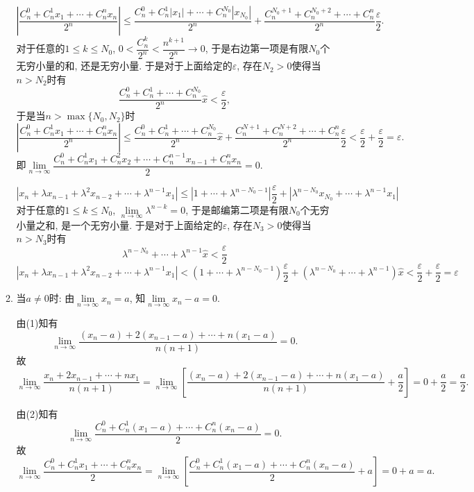\documentclass[UTF8,a4paper,20pt]{article}
\begin{document}
\begin{enumerate}
\begin{enumerate}[1$^{\circ}$]
	\begin{equation*}
	\left|\dfrac{C_n^0+C_n^1x_1+\cdots+C_n^n x_n}{2^n}\right|\leqslant\dfrac{C_n^0+C_n^1|x_1|+\cdots+C_n^{N_0}|x_{N_0}|}{2^n}+\dfrac{C_n^{N_0+1}+C_n^{N_0+2}+\cdots+C_n^n}{2^n}\dfrac{\varepsilon}{2}.
	\end{equation*}
对于任意的$1\leqslant k\leqslant N_0$, $0<\dfrac{C_n^k}{2^n}<\dfrac{n^{k+1}}{2^n}\to 0$, 于是右边第一项是有限$N_0$个无穷小量的和, 还是无穷小量. 于是对于上面给定的$\varepsilon$, 存在$N_2>0$使得当$n>N_2$时有
\[\dfrac{C_n^0+C_n^1+\cdots+C_n^{N_0}}{2^n}\hat{x}<\dfrac{\varepsilon}{2},\]
于是当$n>\max\{N_0,N_2\}$时
	\[\left|\dfrac{C_n^0+C_n^1x_1+\cdots+C_n^n x_n}{2^n}\right|\leqslant\dfrac{C_n^0+C_n^1+\cdots+C_n^{N_0}}{2^n}\hat{x}+\dfrac{C_n^{N+1}+C_n^{N+2}+\cdots+C_n^n}{2^n}\dfrac{\varepsilon}{2}<\dfrac{\varepsilon}{2}+\dfrac{\varepsilon}{2}=\varepsilon.\]
即$\lim\limits_{n\to\infty}\dfrac{C_n^0+C_n^1x_1+C_n^2x_2+\cdots+C_n^{n-1}x_{n-1}+C_n^n x_n}{2}=0$.

	\begin{equation*}
	\left|x_n+\lambda x_{n-1}+ \lambda^2 x_{n-2}+\cdots+\lambda^{n-1}x_1\right|\leqslant\left|1+\cdots+\lambda^{n-N_0-1}\right|\dfrac{\varepsilon}{2}+|\lambda^{n-N_0}x_{N_0}+\cdots+\lambda^{n-1}x_1|
	\end{equation*}
对于任意的$1\leqslant k\leqslant N_0$, $\lim\limits_{n\to\infty}\lambda^{n-k}=0$, 于是邮编第二项是有限$N_0$个无穷小量之和, 是一个无穷小量. 于是对于上面给定的$\varepsilon$, 存在$N_3>0$使得当$n>N_3$时有
\[\lambda^{n-N_0}+\cdots+\lambda^{n-1}\hat{x}<\dfrac{\varepsilon}{2}\]
\[\left|x_n+\lambda x_{n-1}+ \lambda^2 x_{n-2}+\cdots+\lambda^{n-1}x_1\right|<(1+\cdots+\lambda^{n-N_0-1})\dfrac{\varepsilon}{2}+(\lambda^{n-N_0}+\cdots+\lambda^{n-1})\hat{x}<\dfrac{\varepsilon}{2}+\dfrac{\varepsilon}{2}=\varepsilon\]
	\item {\heiti 当$a\neq 0$时:} 由$\lim\limits_{n\to\infty}x_n=a$, 知$\lim\limits_{n\to\infty}x_n-a=0$.

 由(1)知有
\[\lim\limits_{n\to\infty}\dfrac{(x_n-a)+2(x_{n-1}-a)+\cdots+n(x_1-a)}{n(n+1)}=0.\]
故
\[\lim\limits_{n\to\infty}\dfrac{x_n+2x_{n-1}+\cdots+nx_1}{n(n+1)}=\lim\limits_{n\to\infty}\left[\dfrac{(x_n-a)+2(x_{n-1}-a)+\cdots+n(x_1-a)}{n(n+1)}+\dfrac{a}{2}\right]=0+\dfrac{a}{2}=\dfrac{a}{2}.\]

由(2)知有
\[\lim\limits_{n\to\infty}\dfrac{C_n^0+C_n^1(x_1-a)+\cdots+C_n^n(x_n-a)}{2}=0.\]
故
\[\lim\limits_{n\to\infty}\dfrac{C_n^0+C_n^1x_1+\cdots+C_n^n x_n}{2}=\lim\limits_{n\to\infty}\left[\dfrac{C_n^0+C_n^1(x_1-a)+\cdots+C_n^n(x_n-a)}{2}+a\right]=0+a=a.\]


\end{enumerate}
\end{enumerate}
\end{document}
